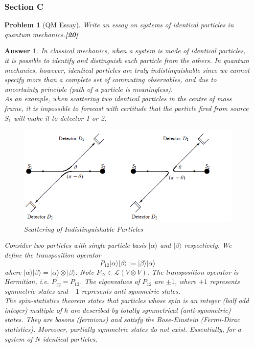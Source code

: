 \documentclass[a4paper]{article}
\newtheorem{ans}{Answer}[subsection]
\theoremstyle{new}
\newtheorem{qns}{Problem}[subsection]
\begin{document}
\subsubsection{Section C}
\begin{qns}[QM Essay]
Write an essay on systems of identical particles in quantum mechanics.\hfill\textbf{[20]}
\end{qns}
\begin{ans}
In classical mechanics, when a system is made of identical particles, it is possible to identify and distinguish each particle from the others. In quantum mechanics, however, identical particles are truly indistinguishable since we cannot specify more than a complete set of commuting observables, and due to uncertainty principle (path of a particle is meaningless).\\[5pt]
As an example, when scattering two identical particles in the centre of mass frame, it is impossible to forecast with certitude that the particle fired from source $S_1$ will make it to detector 1 or 2. 
\begin{figure}[H]
    \centering
    \includegraphics[width=\linewidth]{indistinguishable.PNG}
    \caption{Scattering of Indistinguishable Particles}
\end{figure}
Consider two particles with single particle basis $|\alpha\rangle$ and $|\beta\rangle$ respectively. We define the transposition operator
$$P_{12}|\alpha\rangle|\beta\rangle:=|\beta\rangle|\alpha\rangle$$
where $|\alpha\rangle|\beta\rangle=|\alpha\rangle\otimes|\beta\rangle$. Note $P_{12}\in\mathcal{L}(V\otimes V)$. The transposition operator is Hermitian, i.e. $P_{12}^\dag=P_{12}$. The eigenvalues of $P_{12}$ are $\pm1$, where $+1$ represents symmetric states and $-1$ represents anti-symmetric states.\\[5pt]
The spin-statistics theorem states that particles whose spin is an integer (half odd integer) multiple of $\hbar$ are described by totally symmetrical (anti-symmetric) states. They are bosons (fermions) and satisfy the Bose-Einstein (Fermi-Dirac statistics). Moreover, partially symmetric states do not exist. Essentially, for a system of $N$ identical particles,

\end{ans}
\end{document}
